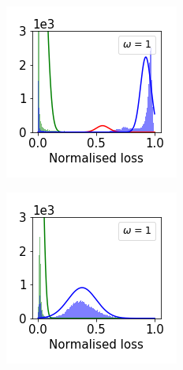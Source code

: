 \documentclass[12pt]{article}
\begin{document}
\begin{figure}[t]
\begin{subfigure}{.18\textwidth}
    \end{subfigure}
    \begin{subfigure}{.18\textwidth}
      \centering
      \includegraphics[width=\linewidth]{images/loss_dist/EDM_0.6_0.00_imagenet32.png} 
    \end{subfigure}
    \begin{subfigure}{.18\textwidth}
      \centering
      \includegraphics[width=\linewidth]{images/loss_dist/DM_0.6_0.00_cifar100.png} 

\end{subfigure}
\end{figure}
\end{document}
